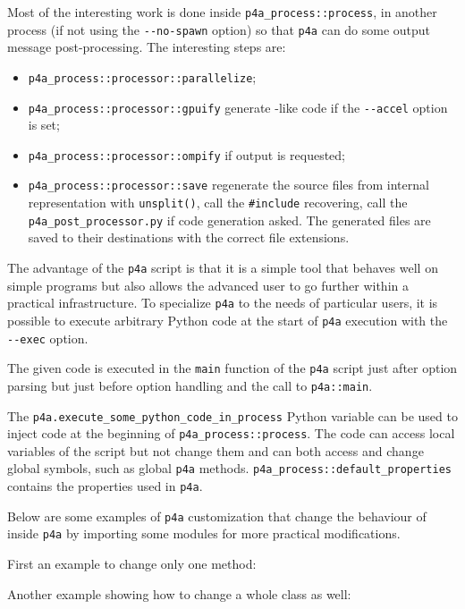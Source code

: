 \documentclass[a4paper]{article}
\begin{document}
Most of the interesting work is done inside \verb|p4a_process::process|,
in another process (if not using the \verb|--no-spawn| option) so that
\texttt{p4a} can do some \Apips output message post-processing. The
interesting steps are:
\begin{itemize}
\item \verb|p4a_process::processor::parallelize|;
\item \verb|p4a_process::processor::gpuify| generate \Agpu-like code if the
  \verb|--accel| option is set;
\item \verb|p4a_process::processor::ompify| if \Aopenmp output
  is requested;
\item \verb|p4a_process::processor::save| regenerate the source files from
  \Apips internal representation with \verb|unsplit()|, call the
  \verb|#include| recovering, call the \verb|p4a_post_processor.py| if
  \Agpu code generation asked. The generated files are saved to
  their destinations with the correct file extensions.
\end{itemize}

The advantage of the \texttt{p4a} script is that it is a simple tool that
behaves well on simple programs but also allows the advanced user to go
further within a practical infrastructure.
To specialize \texttt{p4a} to the needs of particular users, it is
possible to execute
arbitrary Python code at the start of \texttt{p4a} execution with the
\verb|--exec| option.

The given code is executed in the \verb|main| function of the \verb|p4a|
script just after option parsing but just before option handling and the
call to \verb|p4a::main|.

The \verb|p4a.execute_some_python_code_in_process| Python variable can be
used to inject code at the beginning of \verb|p4a_process::process|.
The code can access local variables of the script but not change
them and can both access and change global symbols, such as global
\texttt{p4a} methods.
\verb|p4a_process::default_properties| contains the \Apips properties used
in \texttt{p4a}.

Below are some examples of \texttt{p4a} customization that change the
behaviour of \Apyps inside \texttt{p4a} by importing some modules for more
practical modifications.

First an example to change only one method:


Another example showing how to change a whole class as well:

\end{document}
